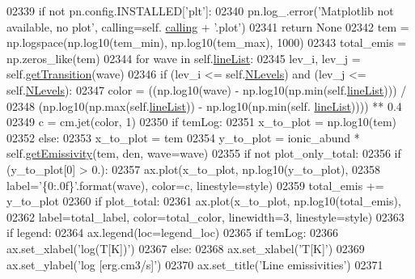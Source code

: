 \begin{DoxyCode}
02339         \textcolor{keywordflow}{if} \textcolor{keywordflow}{not} pn.config.INSTALLED[\textcolor{stringliteral}{'plt'}]: 
02340             pn.log\_.error(\textcolor{stringliteral}{'Matplotlib not available, no plot'}, calling=self.
      \hyperlink{classpyneb_1_1core_1_1pynebcore_1_1_atom_a373b7735acf4f528b54bddf373ad67a1}{calling} + \textcolor{stringliteral}{'.plot'})
02341             \textcolor{keywordflow}{return} \textcolor{keywordtype}{None}
02342         tem = np.logspace(np.log10(tem\_min), np.log10(tem\_max), 1000)
02343         total\_emis = np.zeros\_like(tem)
02344         \textcolor{keywordflow}{for} wave \textcolor{keywordflow}{in} self.\hyperlink{classpyneb_1_1core_1_1pynebcore_1_1_atom_a8280ef5632977a7cf7e8fe4c63127703}{lineList}:
02345             lev\_i, lev\_j = self.\hyperlink{classpyneb_1_1core_1_1pynebcore_1_1_atom_a7c9f17a3d9e841267add92377d9d1ede}{getTransition}(wave)
02346             \textcolor{keywordflow}{if} (lev\_i <= self.\hyperlink{classpyneb_1_1core_1_1pynebcore_1_1_atom_a6b43c1e6431a6786c1b4267f704fb4e8}{NLevels}) \textcolor{keywordflow}{and} (lev\_j <= self.\hyperlink{classpyneb_1_1core_1_1pynebcore_1_1_atom_a6b43c1e6431a6786c1b4267f704fb4e8}{NLevels}):
02347                 color = ((np.log10(wave) - np.log10(np.min(self.\hyperlink{classpyneb_1_1core_1_1pynebcore_1_1_atom_a8280ef5632977a7cf7e8fe4c63127703}{lineList}))) / 
02348                          (np.log10(np.max(self.\hyperlink{classpyneb_1_1core_1_1pynebcore_1_1_atom_a8280ef5632977a7cf7e8fe4c63127703}{lineList})) - np.log10(np.min(self.
      \hyperlink{classpyneb_1_1core_1_1pynebcore_1_1_atom_a8280ef5632977a7cf7e8fe4c63127703}{lineList})))) ** 0.4
02349                 c = cm.jet(color, 1)
02350                 \textcolor{keywordflow}{if} temLog:
02351                     x\_to\_plot = np.log10(tem)
02352                 \textcolor{keywordflow}{else}:
02353                     x\_to\_plot = tem
02354                 y\_to\_plot = ionic\_abund * self.\hyperlink{classpyneb_1_1core_1_1pynebcore_1_1_atom_aaf4e84a9d5f835e6284bd9302314f775}{getEmissivity}(tem, den, wave=wave)
02355                 \textcolor{keywordflow}{if} \textcolor{keywordflow}{not} plot\_only\_total:
02356                     \textcolor{keywordflow}{if} (y\_to\_plot[0] > 0.):
02357                         ax.plot(x\_to\_plot, np.log10(y\_to\_plot),
02358                              label=\textcolor{stringliteral}{'\{0:.0f\}'}.format(wave), color=c, linestyle=style)
02359                 total\_emis += y\_to\_plot
02360         \textcolor{keywordflow}{if} plot\_total:
02361             ax.plot(x\_to\_plot, np.log10(total\_emis),
02362                      label=total\_label, color=total\_color, linewidth=3, linestyle=style)
02363         \textcolor{keywordflow}{if} legend:
02364             ax.legend(loc=legend\_loc)
02365         \textcolor{keywordflow}{if} temLog:
02366             ax.set\_xlabel(\textcolor{stringliteral}{'log(T[K])'})
02367         \textcolor{keywordflow}{else}:
02368             ax.set\_xlabel(\textcolor{stringliteral}{'T[K]'})
02369         ax.set\_ylabel(\textcolor{stringliteral}{'log [erg.cm3/s]'})
02370         ax.set\_title(\textcolor{stringliteral}{'Line emissivities'})
02371 
\end{DoxyCode}
